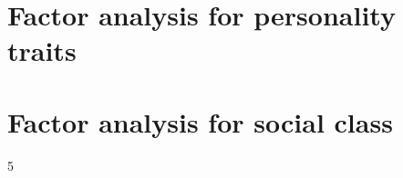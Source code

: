 \documentclass[a4paper, 11pt, onecolumn]{article}
\begin{document}
\newpage




\newpage
\appendix

\section{Factor analysis for personality traits}
\label{section:efa_big5}










\clearpage
\newpage
\section{Factor analysis for social class}
\label{section:mca_class}









\clearpage
\newpage
\setcounter{tocdepth}5
\tableofcontents

\end{document}
